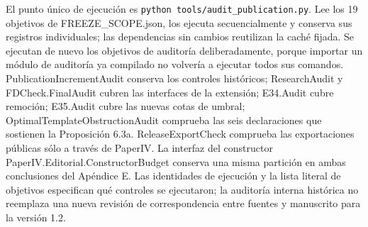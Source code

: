 \documentclass[spanish,11pt,a4paper]{article}
\begin{document}
El punto único de ejecución es \texttt{python\ tools/audit\_publication.py}. Lee los 19 objetivos de {\ttfamily\small FREEZE\_\discretionary{\hbox{\ensuremath{\hookrightarrow}}}{}{}SCOPE.\discretionary{\hbox{\ensuremath{\hookrightarrow}}}{}{}json}, los ejecuta secuencialmente y conserva sus registros individuales; las dependencias sin cambios reutilizan la caché fijada. Se ejecutan de nuevo los objetivos de auditoría deliberadamente, porque importar un módulo de auditoría ya compilado no volvería a ejecutar todos sus comandos. PublicationIncrementAudit conserva los controles históricos; ResearchAudit y FDCheck.FinalAudit cubren las interfaces de la extensión; E34.Audit cubre remoción; E35.Audit cubre las nuevas cotas de umbral; OptimalTemplateObstructionAudit comprueba las seis declaraciones que sostienen la Proposición 6.3a. ReleaseExportCheck comprueba las exportaciones públicas sólo a través de PaperIV. La interfaz del constructor {\ttfamily\small PaperIV.\discretionary{\hbox{\ensuremath{\hookrightarrow}}}{}{}Editorial.\discretionary{\hbox{\ensuremath{\hookrightarrow}}}{}{}ConstructorB\discretionary{\hbox{\ensuremath{\hookrightarrow}}}{}{}udget} conserva una misma partición en ambas conclusiones del Apéndice E. Las identidades de ejecución y la lista literal de objetivos especifican qué controles se ejecutaron; la auditoría interna histórica no reemplaza una nueva revisión de correspondencia entre fuentes y manuscrito para la versión 1.2.
\end{document}
